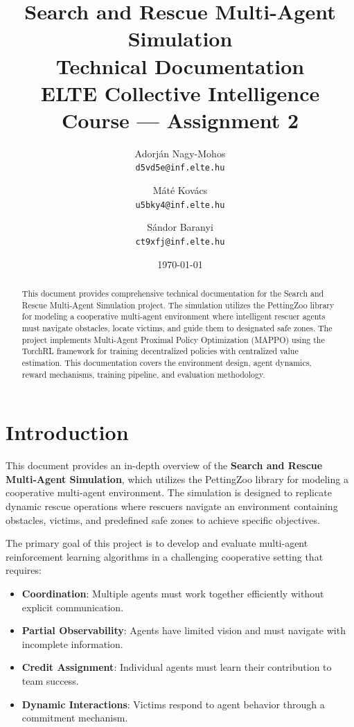 \documentclass[11pt,a4paper]{article}
\title{
    \textbf{Search and Rescue Multi-Agent Simulation}\\[0.5em]
    \Large Technical Documentation\\[1em]
    \normalsize ELTE Collective Intelligence Course --- Assignment 2
}
\author{
    Adorján Nagy-Mohos\\
    \texttt{d5vd5e@inf.elte.hu}
    \and
    Máté Kovács\\
    \texttt{u5bky4@inf.elte.hu}
    \and
    Sándor Baranyi\\
    \texttt{ct9xfj@inf.elte.hu}
}
\date{\today}
\begin{document}
\maketitle

\begin{abstract}
This document provides comprehensive technical documentation for the Search and Rescue Multi-Agent Simulation project.
The simulation utilizes the PettingZoo library for modeling a cooperative multi-agent environment where intelligent rescuer agents must navigate obstacles, locate victims, and guide them to designated safe zones.
The project implements Multi-Agent Proximal Policy Optimization (MAPPO) using the TorchRL framework for training decentralized policies with centralized value estimation.
This documentation covers the environment design, agent dynamics, reward mechanisms, training pipeline, and evaluation methodology.
\end{abstract}

\tableofcontents
\newpage

\section{Introduction}
\label{sec:introduction}

This document provides an in-depth overview of the \textbf{Search and Rescue Multi-Agent Simulation}, which utilizes the PettingZoo library for modeling a cooperative multi-agent environment.
The simulation is designed to replicate dynamic rescue operations where rescuers navigate an environment containing obstacles, victims, and predefined safe zones to achieve specific objectives.

The primary goal of this project is to develop and evaluate multi-agent reinforcement learning algorithms in a challenging cooperative setting that requires:
\begin{itemize}
    \item \textbf{Coordination}: Multiple agents must work together efficiently without explicit communication.
    \item \textbf{Partial Observability}: Agents have limited vision and must navigate with incomplete information.
    \item \textbf{Credit Assignment}: Individual agents must learn their contribution to team success.
    \item \textbf{Dynamic Interactions}: Victims respond to agent behavior through a commitment mechanism.
\end{itemize}
\end{document}

